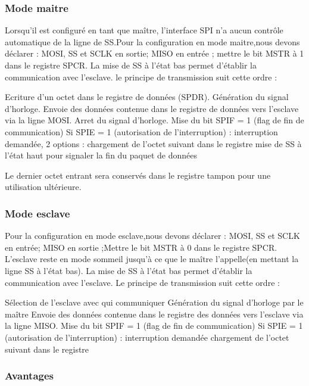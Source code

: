 \documentclass[french,a4paper,12pt]{report}
\begin{document}
  		\subsubsection{Mode maitre}
  		
  		Lorsqu'il est configuré en tant que maître, l'interface SPI n'a aucun contrôle automatique de la ligne de SS.Pour la configuration en mode maitre,nous devons déclarer : MOSI, SS et SCLK en sortie; MISO en entrée ; mettre le bit MSTR à 1 dans le registre SPCR. La mise de SS à l’état bas permet
d'établir la communication avec l’esclave.
le principe de transmission suit cette ordre :
 
    Ecriture d’un octet dans le registre de données (SPDR).
    Génération du signal d'horloge.
    Envoie des données contenue dans le registre de données vers l’esclave via la ligne MOSI.
    Arret du signal d'horloge.
    Mise du bit SPIF = 1 (flag de fin de communication)
    Si SPIE = 1 (autorisation de l’interruption) : interruption demandée, 2 options :
        chargement de l’octet suivant dans le registre
        mise de SS à l’état haut pour signaler la fin du paquet de données
 
	Le dernier octet entrant sera conservés dans le registre tampon pour une utilisation ultérieure.
 
  		\subsubsection{Mode esclave}
  		
  		Pour la configuration en mode esclave,nous devons déclarer : MOSI, SS et SCLK en entrée; MISO en sortie ;Mettre le bit MSTR à 0 dans le registre SPCR. L’esclave reste en mode sommeil jusqu’à ce que le maître l'appelle(en mettant la ligne SS à l’état bas). La mise de SS à l’état bas permet d'établir la communication avec l’esclave. Le principe de transmission suit cette ordre :
 
    Sélection de l'esclave avec qui communiquer
    Génération du signal d'horloge par le maître
    Envoie des données contenue dans le registre des données vers l’esclave via la ligne MISO.
    Mise du bit SPIF = 1 (flag de fin de communication)
    Si SPIE = 1 (autorisation de l’interruption) :
        interruption demandée
        chargement de l’octet suivant dans le registre

			\subsubsection{Avantages}
 
\end{document}

